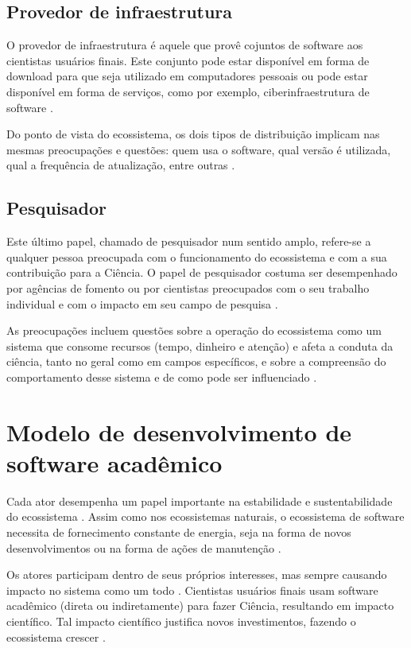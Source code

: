 \subsection{Provedor de infraestrutura}

O provedor de infraestrutura é aquele que provê cojuntos de software aos
cientistas usuários finais. Este conjunto pode estar disponível em forma de
download para que seja utilizado em computadores pessoais ou pode estar
disponível em forma de serviços, como por exemplo, ciberinfraestrutura
de software \cite{council2007cyberinfrastructure, stewart2010cyberinfrastructure}.

Do ponto de vista do ecossistema, os dois tipos de distribuição implicam nas
mesmas preocupações e questões: quem usa o software, qual versão é utilizada, 
qual a frequência de atualização, entre outras \cite{howison2015understanding}.

\subsection{Pesquisador}

Este último papel, chamado de pesquisador num sentido amplo, refere-se a
qualquer pessoa preocupada com o funcionamento do ecossistema e com a sua
contribuição para a Ciência. O papel de pesquisador costuma ser desempenhado
por agências de fomento ou por cientistas preocupados com o seu trabalho
individual e com o impacto em seu campo de pesquisa
\cite{howison2015understanding}.

As preocupações incluem questões sobre a operação do ecossistema
como um sistema que consome recursos (tempo, dinheiro e atenção) e afeta a
conduta da ciência, tanto no geral como em campos específicos, 
e sobre a compreensão do comportamento desse sistema e de 
como pode ser influenciado \cite{howison2015understanding}.

\section{Modelo de desenvolvimento de software acadêmico}

Cada ator desempenha um papel importante na estabilidade e sustentabilidade do
ecossistema \cite{dhungana2010software}. Assim como nos ecossistemas naturais,
o ecossistema de software necessita de fornecimento constante de energia, seja
na forma de novos desenvolvimentos ou na forma de ações de manutenção
\cite{dhungana2010software}.

Os atores participam dentro de seus próprios interesses, mas sempre causando
impacto no sistema como um todo \cite{manikas2013software}.
Cientistas usuários finais usam software acadêmico (direta ou indiretamente)
para fazer Ciência, resultando em impacto científico. Tal impacto científico
justifica novos investimentos, fazendo o ecossistema crescer
\cite{howison2015understanding}.

